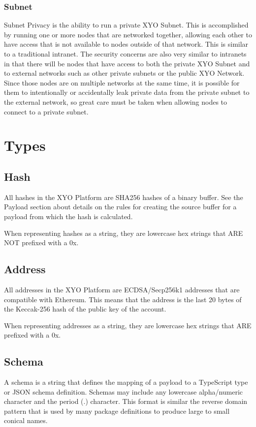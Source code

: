 \documentclass{article}
\begin{document}
\subsubsection{Subnet}
Subnet Privacy is the ability to run a private XYO Subnet.  This is accomplished by running one or more nodes that are networked together, allowing each other to have access that is not available to nodes outside of that network.  This is similar to a traditional intranet.  The security concerns are also very similar to intranets in that there will be nodes that have access to both the private XYO Subnet and to external networks such as other private subnets or the public XYO Network.  Since those nodes are on multiple networks at the same time, it is possible for them to intentionally or accidentally leak private data from the private subnet to the external network, so great care must be taken when allowing nodes to connect to a private subnet.

\clearpage
\section{Types}
\subsection{Hash}
All hashes in the XYO Platform are SHA256 hashes of a binary buffer.  See the Payload section about details on the rules for creating the source buffer for a payload from which the hash is calculated.

When representing hashes as a string, they are lowercase hex strings that ARE NOT prefixed with a 0x.

\subsection{Address}
All addresses in the XYO Platform are ECDSA/Secp256k1 addresses that are compatible with Ethereum.  This means that the address is the last 20 bytes of the Keccak-256 hash of the public key of the account.

When representing addresses as a string, they are lowercase hex strings that ARE prefixed with a 0x.

\subsection{Schema}
A schema is a string that defines the mapping of a payload to a TypeScript type or JSON schema definition.  Schemas may include any lowercase alpha/numeric character and the period (.) character.  This format is similar the reverse domain pattern that is used by many package definitions to produce large to small conical names.
\end{document}
